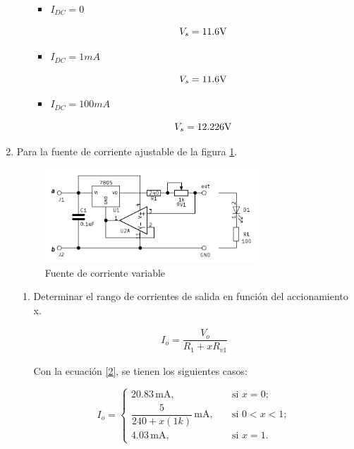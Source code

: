 \begin{enumerate}
\begin{enumerate}
                    \begin{itemize}
                        \item $I_{DC}=0$

                            $$V_s=11.6\volt$$
                        \item $I_{DC}=1mA$

                            $$V_s=11.6\volt$$
                        \item $I_{DC}=100mA$

                            $$V_s=12.226\volt$$
                    \end{itemize}
            \end{enumerate}

        \item Para la fuente de corriente ajustable de la figura \ref{fig:fuente_corriente_variable}.

            \begin{figure}[H]
                \centering
                \includegraphics[width=8cm]{Imagenes/fuente_corriente_variable.png}
                \caption{Fuente de corriente variable}
                \label{fig:fuente_corriente_variable}
            \end{figure}
            \begin{enumerate}
                \item Determinar el rango de corrientes de salida en función del accionamiento x.

                    \begin{gather}
                        I_o=\dfrac{V_o}{R_1+xR_{v1}} \label{2}
                    \end{gather}

                    Con la ecuación \ref{2}, se tienen los siguientes casos:

                    \begin{equation}
                        I_o =
                        \begin{cases}
                            20.83 \, \mathrm{mA}, & \quad \text{si } x = 0; \\[0.5cm]
                            \dfrac{5}{240+x(1k)} \, \mathrm{mA}, & \quad \text{si } 0 < x < 1; \\[0.5cm]
                            4.03 \, \mathrm{mA}, & \quad \text{si } x = 1.
                        \end{cases}
                    \end{equation}
            \end{enumerate}


\end{enumerate}

